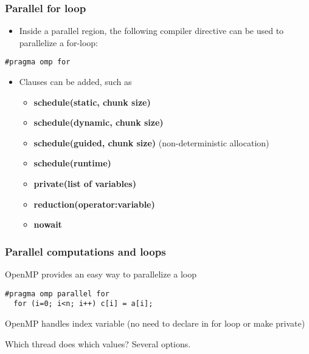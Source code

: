 \documentclass{beamer}
\begin{document}
\begin{frame}
\frametitle{Parallel for loop}

\begin{block}{}
\begin{itemize}
 \item Inside a parallel region, the following compiler directive can be used to parallelize a for-loop:
\end{itemize}

\noindent


\begin{verbatim}
#pragma omp for

\end{verbatim}

\begin{itemize}
\item Clauses can be added, such as
\begin{itemize}

  \item \textbf{schedule(static, chunk size)}

  \item \textbf{schedule(dynamic, chunk size)} 

  \item \textbf{schedule(guided, chunk size)} (non-deterministic allocation)

  \item \textbf{schedule(runtime)}

  \item \textbf{private(list of variables)}

  \item \textbf{reduction(operator:variable)}

  \item \textbf{nowait}
\end{itemize}

\noindent
\end{itemize}

\noindent
\end{block}
\end{frame}

\begin{frame}
\frametitle{Parallel computations and loops}

\begin{block}{}
OpenMP provides an easy way to parallelize a loop



\begin{verbatim}
#pragma omp parallel for
  for (i=0; i<n; i++) c[i] = a[i];

\end{verbatim}

OpenMP handles index variable (no need to declare in for loop or make private)

Which thread does which values?  Several options. 
\end{block}
\end{frame}
\end{document}
